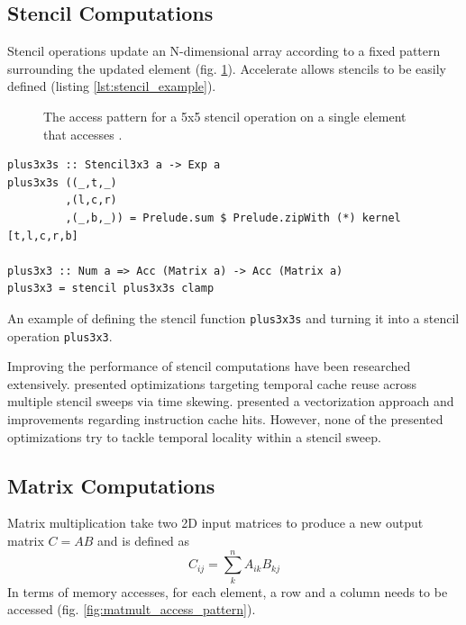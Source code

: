 \documentclass{article}
\newcommand{\TODO}[1]{\noindent{\color{red}\textbf{[TODO] #1}}}
\begin{document}
\subsection{Stencil Computations}
Stencil operations update an N-dimensional array according to a fixed pattern surrounding the updated element (fig. \ref{fig:stencil_access_pattern}).
Accelerate allows stencils to be easily defined (listing \ref{lst:stencil_example}).

\begin{figure}
    \centering
    \caption{
        The access pattern for a 5x5 stencil operation on a single element  that accesses .
    }
    \label{fig:stencil_access_pattern}
\end{figure}

\begin{listing}
    \begin{verbatim}
plus3x3s :: Stencil3x3 a -> Exp a
plus3x3s ((_,t,_)
         ,(l,c,r)
         ,(_,b,_)) = Prelude.sum $ Prelude.zipWith (*) kernel [t,l,c,r,b]

plus3x3 :: Num a => Acc (Matrix a) -> Acc (Matrix a)
plus3x3 = stencil plus3x3s clamp
    \end{verbatim}
    \caption{
        An example of defining the stencil function \texttt{plus3x3s} and turning it into a stencil operation \texttt{plus3x3}.
    }
    \label{lst:stencil_example}
\end{listing}

Improving the performance of stencil computations have been researched extensively.
\citet{kamil2006implicit} presented optimizations targeting temporal cache reuse across multiple stencil sweeps via time skewing.
\citet{zhao2019exploiting} presented a vectorization approach and improvements regarding instruction cache hits.
However, none of the presented optimizations try to tackle temporal locality within a stencil sweep.
\TODO{Expand on this}

\subsection{Matrix Computations}
\label{sec:matrix_intro}
Matrix multiplication take two 2D input matrices to produce a new output matrix $C = AB$ and is defined as
\[
    C_{ij} = \sum^n_k{A_{ik}B_{kj}}
\]
In terms of memory accesses, for each element, a row and a column needs to be accessed (fig. \ref{fig:matmult_access_pattern}).
\end{document}
